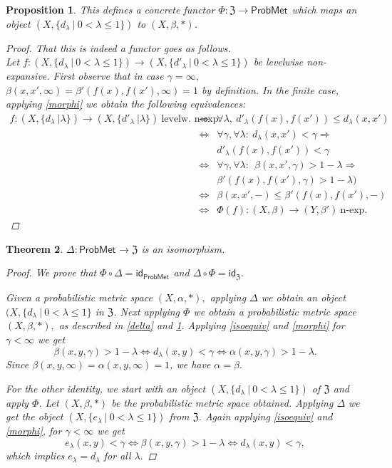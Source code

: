 \documentclass[12pt,a4paper]{amsart}
\theoremstyle{theorem}
\newtheorem{theorem}{Theorem}[section]
\newtheorem{proposition}[theorem]{Proposition}
\theoremstyle{definition}
\newcommand{\zz}{\ensuremath{\mathfrak{Z}}}
\newcommand{\PM}{\ensuremath{\mathsf{ProbMet_{}}}}
\renewcommand{\a}{\ensuremath{\alpha}}
\renewcommand{\b}{\ensuremath{\beta}}
\renewcommand{\l}{\ensuremath{\lambda}}
\def\rw{\rightarrow}
\begin{document}
{\begin{proposition}\label{Phi}
This defines a concrete functor $\Phi : \zz \rw \PM$ which maps an object $(X, \{ d_\l \ | \ 0 < \l \leq 1 \})$ to $(X, \b, *)$. 
\begin{proof}
That this is indeed a functor goes as follows.\\
Let $f: (X, \{ d_\l \ | \ 0 < \l \leq 1 \}) \rw (X, \{ d'_\l \ | \ 0 < \l \leq 1 \})$ be levelwise non-expansive.
First observe that in case $\gamma = \infty,$  $\b(x,x',\infty) =  \b'(f(x), f(x'), \infty )= 1$ by definition.
 In the finite case, applying \eqref{morphi} we obtain the following equivalences:
  \begin{eqnarray*}\label{phifunctor}
  f:  (X, \{ d_\l \ | \l \}) \rw (X, \{ d'_\l \ | \l \}) \  \text{levelw. n-exp.}&\Leftrightarrow & \forall \l, \  d'_\l(f(x), f(x')) \leq d_\l (x,x')\\
&\Leftrightarrow& \forall \gamma,  \forall \l : \  d_\l(x,x') < \gamma \Rightarrow\\
&&  d'_\l(f(x), f(x')) < \gamma\\
&\Leftrightarrow& \forall \gamma, \forall \l : \ \ \b(x,x', \gamma) > 1 - \l  \Rightarrow\\
&& \b'(f(x), f(x') , \gamma) > 1 - \l )\\
&\Leftrightarrow&\b(x,x', -) \leq \b'(f(x), f(x') , -)\\
&\Leftrightarrow&\Phi(f) : (X, \b ) \rw (Y, \b' )\  \text{n-exp.} 
\end{eqnarray*}
\end{proof}
\end{proposition}


\begin{theorem}
$\Delta: \PM \rw \zz$ is an isomorphism.
\begin{proof}
We prove that $ \Phi \circ \Delta =\mathsf{id}_{\PM} $ and $ \Delta \circ \Phi = \mathsf{id}_{\zz}.$

Given a probabilistic metric space $(X, \a, *),$ applying $\Delta$ we obtain an object  $(X, \{d_\l \ | \ 0 <\l \leq 1 \}$ in $\zz$. Next applying $\Phi$ we obtain a probabilistic metric space $(X, \b, *),$ as described in \ref{delta} and \ref{Phi}. Applying \eqref{isoequiv} and \eqref{morphi}  for $\gamma < \infty$ we get 
$$
\b(x,y,\gamma) > 1 - \l  \Leftrightarrow d_\l (x,y) < \gamma \Leftrightarrow \a(x,y,\gamma) > 1-\l.
$$
Since $\b(x,y,\infty) = \a(x,y,\infty)= 1$, we have $\a = \b.$ 

For the other identity, we start with an object  $(X, \{d_\l \ | \ 0 <\l \leq 1 \})$ of $\zz$ and apply $\Phi$. Let $(X, \b, *)$ be the probabilistic metric space obtained. Applying $\Delta$ we get the object $(X, \{e_\l \ | \ 0 <\l \leq 1 \})$ from $\zz.$
Again applying \eqref{isoequiv} and \eqref{morphi}, for $\gamma < \infty$ we get
$$
e_\l(x,y) < \gamma \Leftrightarrow \b(x,y, \gamma) > 1 - \l \Leftrightarrow d_\l (x,y)  < \gamma,
$$
which implies $e_\l = d_\l$ for all $\l.$
\end{proof}


\end{theorem}}
\end{document}
